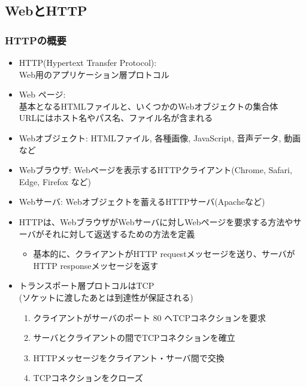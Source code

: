 \subsection{WebとHTTP}
\subsubsection{HTTPの概要}

\begin{itemize}
  \item HTTP(Hypertext Transfer Protocol):\\
    Web用のアプリケーション層プロトコル
  \item Web ページ:\\
    基本となるHTMLファイルと、いくつかのWebオブジェクトの集合体\\
    URLにはホスト名やパス名、ファイル名が含まれる
  \item Webオブジェクト: HTMLファイル, 各種画像, JavaScript, 音声データ, 動画など
  \item Webブラウザ: Webページを表示するHTTPクライアント(Chrome, Safari, Edge, Firefox など)
  \item Webサーバ: Webオブジェクトを蓄えるHTTPサーバ(Apacheなど)
\end{itemize}

\begin{itemize}
  \item HTTPは、WebブラウザがWebサーバに対しWebページを要求する方法やサーバがそれに対して返送するための方法を定義
  \begin{itemize}
    \item 基本的に、クライアントがHTTP requestメッセージを送り、サーバがHTTP responseメッセージを返す %
  \end{itemize}
  \item トランスポート層プロトコルはTCP\\
    (ソケットに渡したあとは到達性が保証される)
  \begin{enumerate}  %
    \item クライアントがサーバのポート 80 へTCPコネクションを要求
    \item サーバとクライアントの間でTCPコネクションを確立
    \item HTTPメッセージをクライアント・サーバ間で交換
    \item TCPコネクションをクローズ
  \end{enumerate}
\end{itemize}


